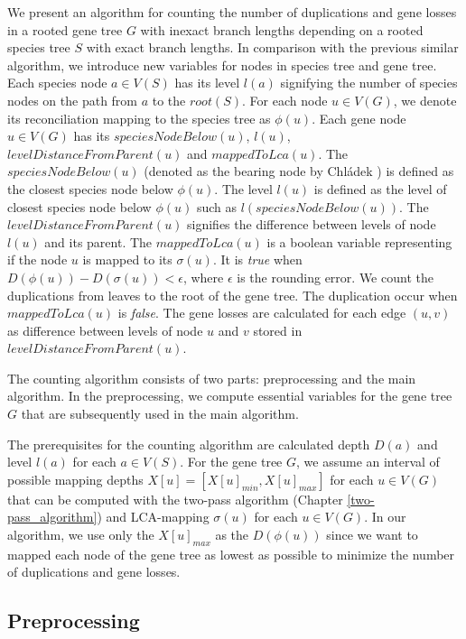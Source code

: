 We present an algorithm for counting the number of duplications and gene losses in a rooted gene tree $G$ with inexact branch lengths depending on a rooted species tree $S$ with exact branch lengths. In comparison with the previous similar algorithm, we introduce new variables for nodes in species tree and gene tree. Each species node $a \in V(S)$ has its level $l(a)$ signifying the number of species nodes on the path from $a$ to the $root(S)$. For each node $u \in V(G)$, we denote its reconciliation mapping to the species tree as $\phi(u)$. Each gene node $u \in V(G)$ has its $speciesNodeBelow(u)$, $l(u)$, $levelDistanceFromParent(u)$ and $mappedToLca(u)$. The $speciesNodeBelow(u)$ (denoted as the bearing node by Chládek \cite{chladek_thesis}) is defined as the closest species node below $\phi(u)$. The level $l(u)$ is defined as the level of closest species node below $\phi(u)$ such as $l(speciesNodeBelow(u))$. The $levelDistanceFromParent(u)$ signifies the difference between levels of node $l(u)$ and its parent. The $mappedToLca(u)$ is a boolean variable representing if the node $u$ is mapped to its $\sigma(u)$. It is \emph{true} when $D(\phi(u)) - D(\sigma(u)) < \epsilon$, where $\epsilon$ is the rounding error. We count the duplications from leaves to the root of the gene tree. The duplication occur when $mappedToLca(u)$ is \emph{false}. The gene losses are calculated for each edge $(u, v)$ as difference between levels of node $u$ and $v$ stored in $levelDistanceFromParent(u)$.

The counting algorithm consists of two parts: preprocessing and the main algorithm. In the preprocessing, we compute essential variables for the gene tree $G$ that are subsequently used in the main algorithm.

The prerequisites for the counting algorithm are calculated depth $D(a)$ and level $l(a)$ for each $a \in V(S)$. For the gene tree $G$, we assume an interval of possible mapping depths $X[u] = [ X[u]_{min}, X[u]_{max} ]$ for each $u \in V(G)$ that can be computed with the two-pass algorithm (Chapter \ref{two-pass_algorithm}) and LCA-mapping $\sigma(u)$ for each $u \in V(G)$. In our algorithm, we use only the $X[u]_{max}$ as the $D(\phi(u))$ since we want to mapped each node of the gene tree as lowest as possible to minimize the number of duplications and gene losses.

\subsection{Preprocessing} \label{preprocessing}

